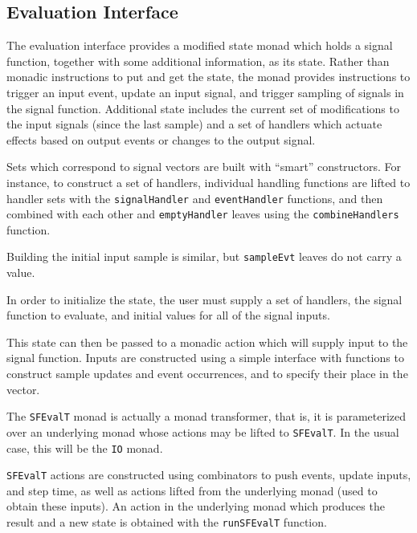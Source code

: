 \subsection{Evaluation Interface}
\label{subsection:System_Design_and_Interface-Evaluation_Interface}

The evaluation interface provides a modified state monad which holds a signal
function, together with some additional information, as its state.
Rather than monadic instructions to put and get the state, the monad provides instructions
to trigger an input event, update an input signal, and trigger sampling of
signals in the signal function. Additional state includes the current set of
modifications to the input signals (since the last sample) and a set of
handlers which actuate effects based on output events or changes to the output
signal.

Sets which correspond to signal vectors are built with ``smart'' constructors.
For instance, to construct a set of handlers, individual handling functions are
lifted to handler sets with the {\tt signalHandler} and {\tt eventHandler}
functions, and then combined with each other and {\tt emptyHandler} leaves
using the {\tt combineHandlers} function.

Building the initial input sample is similar, but {\tt sampleEvt} leaves do
not carry a value.

In order to initialize the state, the user must supply a set of handlers, the
signal function to evaluate, and initial values for all of the signal inputs.

This state can then be passed to a monadic action which will supply input to
the signal function. Inputs are constructed using a simple interface with
functions to construct sample updates and event occurrences, and to specify
their place in the vector.

The {\tt SFEvalT} monad is actually a monad transformer, that is, it is
parameterized over an underlying monad whose actions may be lifted to
{\tt SFEvalT}. In the usual case, this will be the {\tt IO} monad.

{\tt SFEvalT} actions are constructed using combinators to push events,
update inputs, and step time, as well as actions lifted from the underlying
monad (used to obtain these inputs). An action in the underlying monad
which produces the result and a new state is obtained with the {\tt runSFEvalT}
function.
